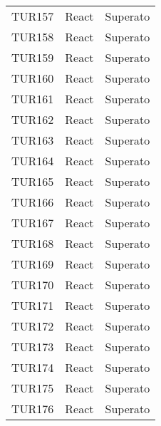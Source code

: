 \documentclass[PianoDiQualifica.tex]{subfiles}
\begin{document}
\begin{longtable}[H]{P{2cm}P{8.5cm}P{3cm}}
	TUR157 & React & Superato \\ 
	TUR158 & React & Superato \\ 
	TUR159 & React & Superato \\ 
	TUR160 & React & Superato \\ 
	TUR161 & React & Superato \\ 
	TUR162 & React & Superato \\ 
	TUR163 & React & Superato \\ 
	TUR164 & React & Superato \\ 
	TUR165 & React & Superato \\ 
	TUR166 & React & Superato \\ 
	TUR167 & React & Superato \\ 
	TUR168 & React & Superato \\ 
	TUR169 & React & Superato \\ 
	TUR170 & React & Superato \\ 
	TUR171 & React & Superato \\ 
	TUR172 & React & Superato \\ 
	TUR173 & React & Superato \\ 
	TUR174 & React & Superato \\ 
	TUR175 & React & Superato \\ 
	TUR176 & React & Superato \\


\end{longtable}
\end{document}
